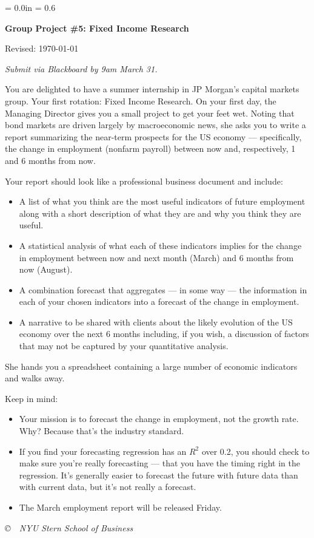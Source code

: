 \documentclass[letterpaper,12pt]{article}
\def\HeadName{Group Project \#5}
\begin{document}
\parindent = 0.0in
\parskip = 0.6\bigskipamount
\thispagestyle{empty}%
\Head

\centerline{\large \bf \HeadName:  Fixed Income Research}%
\centerline{Revised:  \today}

\medskip
{\it Submit via Blackboard by 9am March 31.}
\medskip

You are delighted to have a summer internship in JP Morgan's 
capital markets group.  
Your first rotation:  Fixed Income Research.  
On your first day, the Managing Director gives you 
a small project to get your feet wet. 
Noting that bond markets are driven largely by macroeconomic news, 
she asks you to write a report summarizing the near-term prospects for the US 
economy  --- specifically, 
the change in employment (nonfarm payroll) between now and, respectively, 
1 and 6 months from now. 

Your report should look like a professional business document 
and include:  
%
\begin{itemize}

\item A list of what you think are the most useful indicators
of future employment 
along with a short description of what they are and why you think they 
are useful.  

\item A statistical analysis of what each of these indicators implies  
for the change in employment between now and next month (March) and 6 months from now (August).  

\item A combination forecast that aggregates  --- in some way --- 
the information in each of your chosen indicators into a 
forecast of the change in employment.  

\item A narrative to be shared with clients 
about the likely evolution of the US economy over the next 6 months
including, if you wish, a discussion of factors that may not 
be captured by your quantitative analysis.    
\end{itemize}
%
She hands you a spreadsheet containing a large number of 
economic indicators and walks away.  

Keep in mind: 
\begin{itemize}
\item Your mission is to forecast the change in employment, 
not the growth rate.
Why?  Because that's the industry standard.   
\item If you find your forecasting regression has an $R^2$ over 0.2, 
you should check to make sure you're really forecasting --- that you
have the timing right in the regression.
It's generally easier to forecast the future with future data
than with current data, but it's not really a forecast. 
\item The March employment report will be released Friday.  
\end{itemize}

\vfill \centerline{\it \copyright \ \number\year \ 
NYU Stern School of Business}
\end{document}
